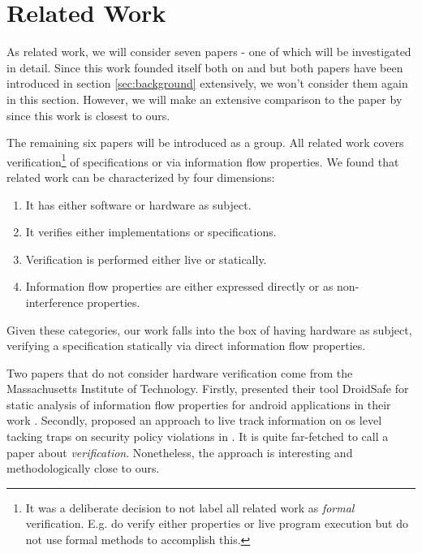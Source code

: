 
\section{Related Work}
\label{sec:related-work}

As related work, we will consider seven papers - one of which will be investigated in detail.
Since this work founded itself both on  \cite{Reid17} and  \cite{Ferraiuolo17} but both papers have been introduced in section \ref{sec:background} extensively, we won't consider them again in this section.
However, we will make an extensive comparison to the paper  \cite{BradfieldS16} by \citeauthor{BradfieldS16} since this work is closest to ours.

The remaining six papers will be introduced as a group.
All related work covers verification\footnote{%
    It was a deliberate decision to not label all related work as \textit{formal} verification.
    E.g. \cite{Zhang15,SuhLZD04} do verify either properties or live program execution but do not use formal methods to accomplish this.
} of specifications or via information flow properties.
We found that related work can be characterized by four dimensions:
\begin{enumerate}
    \item It has either software or hardware as subject.
    \item It verifies either implementations or specifications.
    \item Verification is performed either live or statically.
    \item Information flow properties are either expressed directly or as non-interference properties.
\end{enumerate}

Given these categories, our work falls into the box of having hardware as subject, verifying a specification statically via direct information flow properties.

Two papers that do not consider hardware verification come from the Massachusetts Institute of Technology.
Firstly, \citeauthor{GordonKPGNR15} presented their tool DroidSafe for static analysis of information flow properties for android applications in their work  \cite{GordonKPGNR15}.
Secondly, \citeauthor{SuhLZD04} proposed an approach to live track information on \gls{os} level tacking traps on security policy violations in  \cite{SuhLZD04}.
It is quite far-fetched to call \cite{SuhLZD04} a paper about \textit{verification}.
Nonetheless, the approach is interesting and methodologically close to ours.

